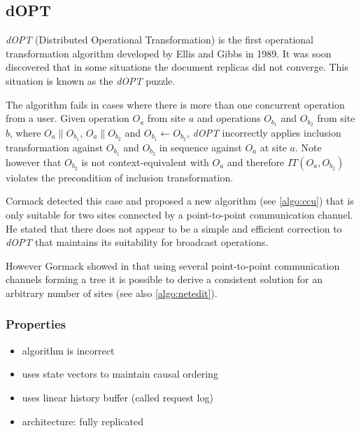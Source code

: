 \subsection{dOPT}
\label{algo:dopt}

\emph{dOPT} (Distributed Operational Transformation) is the first operational transformation algorithm developed by {Ellis and Gibbs}\cite{ellis} in 1989. It was soon discovered that in some situations the document replicas did not converge. This situation is known as the \emph{dOPT} puzzle.

The algorithm fails in cases where there is more than one concurrent operation from a user. Given operation $O_{a}$ from site $a$ and operations $O_{b_{1}}$ and $O_{b_{2}}$ from site $b$, where $O_{a} \parallel O_{b_{1}}$, $O_{a} \parallel O_{b_{2}}$ and $O_{b_{1}} \leftarrow O_{b_{2}}$, \emph{dOPT} incorrectly applies inclusion transformation against $O_{b_{1}}$ and $O_{b_{2}}$ in sequence against $O_{a}$ at site $a$. Note however that $O_{b_{2}}$ is not context-equivalent with $O_{a}$ and therefore $IT(O_{a},O_{b_{2}})$ violates the precondition of inclusion transformation.

Cormack\cite{cormack95a} detected this case and proposed a new algorithm (see \ref{algo:ccu}) that is only suitable for two sites connected by a point-to-point communication channel. He stated that there does not appear to be a simple and efficient correction to \emph{dOPT} that maintains its suitability for broadcast operations.

However Gormack showed in \cite{cormack95b} that using several point-to-point communication channels forming a tree it is possible to derive a consistent solution for an arbitrary number of sites (see also \ref{algo:netedit}).

\subsubsection{Properties}
\begin{itemize}
 \item algorithm is incorrect
 \item uses state vectors to maintain causal ordering
 \item uses linear history buffer (called request log)
 \item architecture: fully replicated
\end{itemize}
